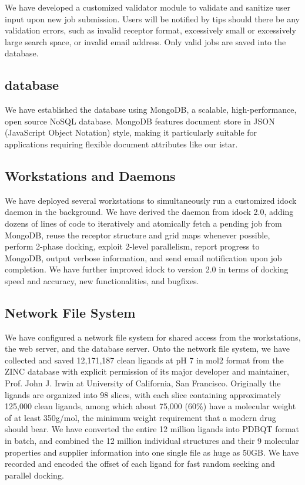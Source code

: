 \documentclass[10pt]{article}
\begin{document}
We have developed a customized validator module to validate and sanitize user input upon new job submission. Users will be notified by tips should there be any validation errors, such as invalid receptor format, excessively small or excessively large search space, or invalid email address. Only valid jobs are saved into the database.

\subsection*{database}
We have established the database using MongoDB, a scalable, high-performance, open source NoSQL database. MongoDB features document store in JSON (JavaScript Object Notation) style, making it particularly suitable for applications requiring flexible document attributes like our istar. 

\subsection*{Workstations and Daemons}
We have deployed several workstations to simultaneously run a customized idock daemon in the background. We have derived the daemon from idock 2.0, adding dozens of lines of code to iteratively and atomically fetch a pending job from MongoDB, reuse the receptor structure and grid maps whenever possible, perform 2-phase docking, exploit 2-level parallelism, report progress to MongoDB, output verbose information, and send email notification upon job completion. We have further improved idock to version 2.0 in terms of docking speed and accuracy, new functionalities, and bugfixes.

\subsection*{Network File System}
We have configured a network file system for shared access from the workstations, the web server, and the database server. Onto the network file system, we have collected and saved 12,171,187 clean ligands at pH 7 in mol2 format from the ZINC database \cite{532,1178} with explicit permission of its major developer and maintainer, Prof. John J. Irwin at University of California, San Francisco. Originally the ligands are organized into 98 slices, with each slice containing approximately 125,000 clean ligands, among which about 75,000 (60\%) have a molecular weight of at least 350g/mol, the minimum weight requirement that a modern drug should bear. We have converted the entire 12 million ligands into PDBQT format in batch, and combined the 12 million individual structures and their 9 molecular properties and supplier information into one single file as huge as 50GB. We have recorded and encoded the offset of each ligand for fast random seeking and parallel docking.
\end{document}
